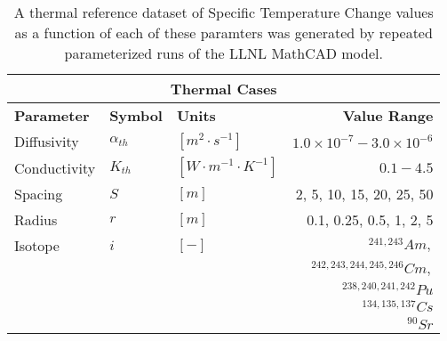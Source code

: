 \begin{table}[ht!]
\centering
\footnotesize{
\begin{tabular}{|l|l|l|r|}
\multicolumn{4}{c}{\textbf{Thermal Cases}}\\
\hline
\textbf{Parameter} & \textbf{Symbol} & \textbf{Units} & \textbf{Value Range} \\
\hline
Diffusivity & $\alpha_{th}$ & $[m^2\cdot s^{-1}]$ & $1.0\times10^{-7}-3.0\times10^{-6}$\\
\hline
Conductivity & $K_{th}$     & $[W\cdot m^{-1} \cdot K^{-1}]$ & $0.1 - 4.5$ \\
\hline
Spacing & $S$ & $[m]$ & 2, 5, 10, 15, 20, 25, 50 \\
\hline
Radius & $r$ & $[m]$ & 0.1, 0.25, 0.5, 1, 2, 5 \\
\hline
Isotope & $i$ & $[-]$ & $^{241,243}Am,$  \\
        & & & $^{242,243,244,245,246}Cm,$  \\
        & & & $^{238,240,241,242}Pu$  \\
        & & & $^{134,135,137}Cs$  \\
        & & & $^{90}Sr$  \\
\hline
\end{tabular}
\caption{A thermal reference dataset of Specific Temperature Change values as a function of each of these paramters was generated by repeated parameterized runs of the LLNL 
MathCAD model\cite{greenberg_application_2012, greenberg_investigations_2012}.}
\label{tab:therm_cases}
}
\end{table}

